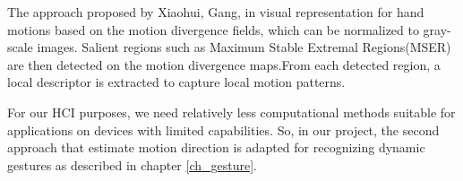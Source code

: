The approach proposed by Xiaohui, Gang, in \cite{dynamic2} visual representation for hand motions based on the motion divergence fields, which can be normalized to gray-scale images. Salient regions such as Maximum Stable Extremal Regions(MSER) are then detected on the motion divergence maps.From each detected region, a local descriptor is extracted to capture local motion patterns.
\bigskip

 For our HCI purposes, we need relatively less computational methods suitable for applications on devices with limited capabilities. So, in our project, the second approach that estimate motion direction\cite{dynamic2} is adapted for recognizing dynamic gestures as described in chapter \ref{ch_gesture}.
 
 
